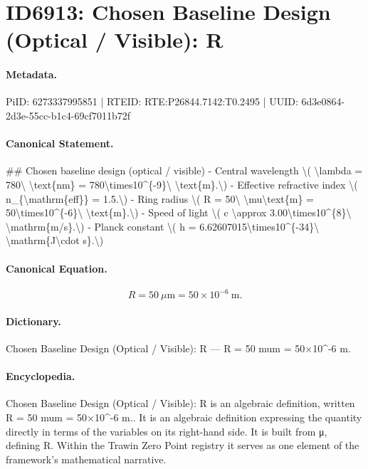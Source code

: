 \section*{ID6913: Chosen Baseline Design (Optical / Visible): R}
\paragraph{Metadata.}
PiID: 6273337995851 | RTEID: RTE:P26844.7142:T0.2495 | UUID: 6d3e0864-2d3e-55cc-b1c4-69cf7011b72f

\paragraph{Canonical Statement.}
\#\# Chosen baseline design (optical / visible) - Central wavelength \textbackslash{}( \textbackslash{}lambda = 780\textbackslash{} \textbackslash{}text\{nm\} = 780\textbackslash{}times10\textasciicircum{}\{-9\}\textbackslash{} \textbackslash{}text\{m\}.\textbackslash{}) - Effective refractive index \textbackslash{}( n\_\{\textbackslash{}mathrm\{eff\}\} = 1.5.\textbackslash{}) - Ring radius \textbackslash{}( R = 50\textbackslash{} \textbackslash{}mu\textbackslash{}text\{m\} = 50\textbackslash{}times10\textasciicircum{}\{-6\}\textbackslash{} \textbackslash{}text\{m\}.\textbackslash{}) - Speed of light \textbackslash{}( c \textbackslash{}approx 3.00\textbackslash{}times10\textasciicircum{}\{8\}\textbackslash{} \textbackslash{}mathrm\{m/s\}.\textbackslash{}) - Planck constant \textbackslash{}( h = 6.62607015\textbackslash{}times10\textasciicircum{}\{-34\}\textbackslash{} \textbackslash{}mathrm\{J\textbackslash{}cdot s\}.\textbackslash{})

\paragraph{Canonical Equation.}
\[
R = 50\ \mu\text{m} = 50\times10^{-6}\ \text{m}.
\]

\paragraph{Dictionary.}
Chosen Baseline Design (Optical / Visible): R — R = 50 mum = 50×10\textasciicircum{}-6 m.

\paragraph{Encyclopedia.}
Chosen Baseline Design (Optical / Visible): R is an algebraic definition, written R = 50 mum = 50×10\textasciicircum{}-6 m.. It is an algebraic definition expressing the quantity directly in terms of the variables on its right-hand side. It is built from μ, defining R. Within the Trawin Zero Point registry it serves as one element of the framework's mathematical narrative.
